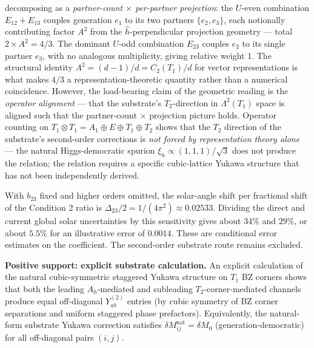 \documentclass[
]{article}
\begin{document}
decomposing as a \emph{partner-count \(\times\) per-partner projection}:
the \(U\)-even combination \(E_{12}+E_{13}\) couples generation \(e_1\)
to its two partners \(\{e_2, e_3\}\), each notionally contributing
factor \(A^2\) from the \(\hat h\)-perpendicular projection geometry ---
total \(2 \times A^2 = 4/3\). The dominant \(U\)-odd combination
\(E_{23}\) couples \(e_2\) to its single partner \(e_3\), with no
analogous multiplicity, giving relative weight \(1\). The structural
identity \(A^2 = (d-1)/d = C_2(T_1)/d\) for vector representations is
what makes \(4/3\) a representation-theoretic quantity rather than a
numerical coincidence. However, the load-bearing claim of the geometric
reading is the \emph{operator alignment} --- that the substrate's
\(T_2\)-direction in \(\Lambda^2(T_1)\) space is aligned such that the
partner-count × projection picture holds. Operator counting on
\(T_1 \otimes T_1 = A_1 \oplus E \oplus T_1 \oplus T_2\) shows that the
\(T_2\) direction of the substrate's second-order corrections is
\emph{not forced by representation theory alone} --- the natural
Higgs-democratic spurion \(\xi_h \propto (1,1,1)/\sqrt{3}\) does not
produce the relation; the relation requires a specific cubic-lattice
Yukawa structure that has not been independently derived.

With \(b_{23}\) fixed and higher orders omitted, the solar-angle shift
per fractional shift of the Condition 2 ratio is
\(\Delta_{23}/2=1/(4\pi^2)\approx0.02533\). Dividing the direct and
current global solar uncertainties by this sensitivity gives about
\(34\%\) and \(29\%\), or about \(5.5\%\) for an illustrative error of
\(0.0014\). These are conditional error estimates on the coefficient.
The second-order substrate route remains excluded.

\textbf{Positive support: explicit substrate calculation.} An explicit
calculation of the natural cubic-symmetric staggered Yukawa structure on
\(T_1\) BZ corners shows that both the leading \(A_h\)-mediated and
subleading \(T_2\)-corner-mediated channels produce equal off-diagonal
\(Y^{(2)}_{ab}\) entries (by cubic symmetry of BZ corner separations and
uniform staggered phase prefactors). Equivalently, the natural-form
substrate Yukawa correction satisfies
\(\delta M_{ij}^{\text{nat}} = \delta M_0\) (generation-democratic) for
all off-diagonal pairs \((i,j)\).
\end{document}
